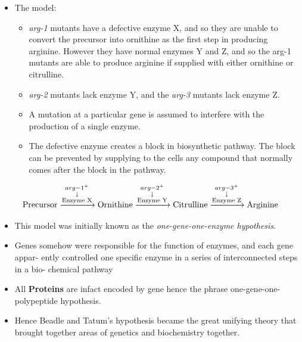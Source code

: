 \documentclass[11pt,dvipsnames,ignorenonframetext,aspectratio=169]{beamer}
\providecommand{\tightlist}{%
  \setlength{\itemsep}{0pt}\setlength{\parskip}{0pt}}
\begin{document}
\begin{frame}{}
\protect\hypertarget{section-8}{}
\begin{itemize}
\tightlist
\item
  The model:

  \begin{itemize}
  \tightlist
  \item
    \emph{arg-1} mutants have a defective enzyme X, and so they are
    unable to convert the precursor into ornithine as the first step in
    producing arginine. However they have normal enzymes Y and Z, and so
    the arg-1 mutants are able to produce arginine if supplied with
    either ornithine or citrulline.
  \item
    \emph{arg-2} mutants lack enzyme Y, and the \emph{arg-3} mutants
    lack enzyme Z.
  \item
    A mutation at a particular gene is assumed to interfere with the
    production of a single enzyme.
  \item
    The defective enzyme creates a block in biosynthetic pathway. The
    block can be prevented by supplying to the cells any compound that
    normally comes after the block in the pathway.
  \end{itemize}
\end{itemize}

\[
 \text{Precursor} \xrightarrow 
 {
 \begin{subarray}{c}
 arg-1^+ \\
 \downarrow \\
 \text{Enzyme X}
 \end{subarray}
 } 
 \text{Ornithine} \xrightarrow
  {
 \begin{subarray}{c}
  arg-2^+ \\
 \downarrow \\
 \text{Enzyme Y}
 \end{subarray}
 }
 \text{Citrulline} \xrightarrow
  {
 \begin{subarray}{c}
  arg-3^+ \\
 \downarrow \\
 \text{Enzyme Z}
 \end{subarray}
 }
 \text{Arginine}
\]
\end{frame}

\begin{frame}{}
\protect\hypertarget{section-9}{}
\begin{itemize}
\tightlist
\item
  This model was initially known as the \emph{one-gene-one-enzyme
  hypothesis}.
\item
  Genes somehow were responsible for the function of enzymes, and each
  gene appar- ently controlled one specific enzyme in a series of
  interconnected steps in a bio- chemical pathway
\item
  All \textbf{Proteins} are infact encoded by gene hence the phrase
  one-gene-one-polypeptide hypothesis.
\item
  Hence Beadle and Tatum's hypothesis became the great unifying theory
  that brought together areas of genetics and biochemistry together.
\end{itemize}
\end{frame}
\end{document}
